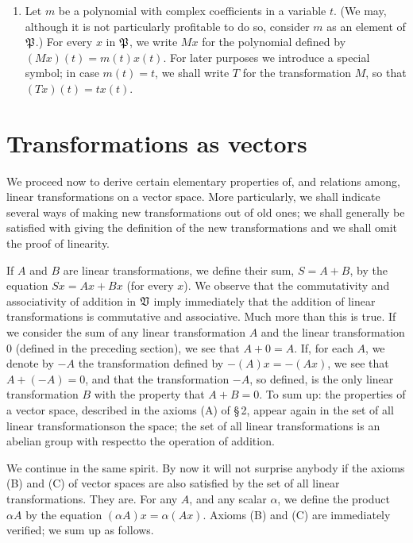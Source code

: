 \begin{enumerate}[wide, nosep, label=(\arabic*)]
    \item Let \(m\) be a polynomial with complex coefficients in a variable
    \(t\). (We may, although it is not particularly profitable to do so,
    consider \(m\) as an element of \(\mathfrak{P}\).) For every \(x\) in
    \(\mathfrak{P}\), we write \(Mx\) for the polynomial defined by \((Mx)(t) =
    m(t)x(t)\). For later purposes we introduce a special symbol; in case \(m(t)
    = t\), we shall write \(T\) for the transformation \(M\), so that \((Tx)(t)
    = tx(t)\).
\end{enumerate}

\section{Transformations as vectors}

We proceed now to derive certain elementary properties of, and relations among,
linear transformations on a vector space. More particularly, we shall indicate
several ways of making new transformations out of old ones; we shall generally
be satisfied with giving the definition of the new transformations and we
shall omit the proof of linearity.

If \(A\) and \(B\) are linear transformations, we define their sum, \(S = A +
B\), by the equation \(Sx = Ax + Bx\) (for every \(x\)). We observe that the
commutativity and associativity of addition in \(\frak{V}\) imply immediately
that the addition of linear transformations is commutative and associative. Much
more than this is true. If we consider the sum of any linear transformation
\(A\) and the linear transformation \(0\) (defined in the preceding section), we
see that \(A + 0 = A\). If, for each \(A\), we denote by \(-A\) the
transformation defined by \(-(A)x = - (Ax)\), we see that \(A + (-A) = 0\), and
that the transformation \(-A\), so defined, is the only linear transformation
\(B\) with the property that \(A+ B= 0\). To sum up: the properties of a vector
space, described in the axioms (A) of \S\,2, appear again in the set of all
linear transformationson the space; the set of all linear transformations is an
abelian group with respectto the operation of addition.

We continue in the same spirit. By now it will not surprise anybody if the
axioms (B) and (C) of vector spaces are also satisfied by the set of all linear
transformations. They are. For any \(A\), and any scalar \(\alpha\), we define
the product \(\alpha A\) by the equation \((\alpha A) x = \alpha (Ax)\). Axioms
(B) and (C) are immediately verified; we sum up as follows.

